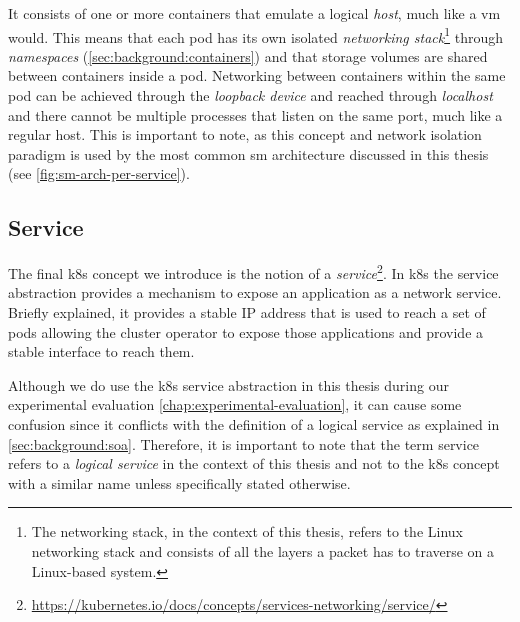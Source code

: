 It consists of one or more containers that emulate a logical \textit{host}, much like a \gls{vm} would. This means that each pod has its own isolated \textit{networking stack}\footnote{The networking stack, in the context of this thesis, refers to the Linux networking stack and consists of all the layers a packet has to traverse on a Linux-based system.} through \textit{namespaces} (\cref{sec:background:containers}) and that storage volumes are shared between containers inside a pod. Networking between containers within the same pod can be achieved through the \textit{loopback device} and reached through \textit{localhost} and there cannot be multiple processes that listen on the same port, much like a regular host. This is important to note, as this concept and network isolation paradigm is used by the most common \gls{sm} architecture discussed in this thesis (see \cref{fig:sm-arch-per-service}).


\subsection{Service}
\label{sec:background:kubernetes:service}

The final \gls{k8s} concept we introduce is the notion of a \textit{service}\footnote{\url{https://kubernetes.io/docs/concepts/services-networking/service/}}. In \gls{k8s} the service abstraction provides a mechanism to expose an application as a network service. Briefly explained, it provides a stable IP address that is used to reach a set of pods allowing the cluster operator to expose those applications and provide a stable interface to reach them. 

Although we do use the \gls{k8s} service abstraction in this thesis during our experimental evaluation \cref{chap:experimental-evaluation}, it can cause some confusion since it conflicts with the definition of a logical service as explained in \cref{sec:background:soa}. Therefore, it is important to note that the term service refers to a \textit{logical service} in the context of this thesis and not to the \gls{k8s} concept with a similar name unless specifically stated otherwise.